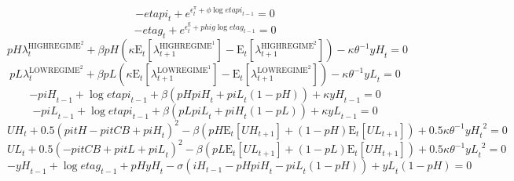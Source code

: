 \begin{equation}
-{e\!t\!a\!p\!i}_{t} + e^{\epsilon^{\pi}_{t} + {\phi} {\log{{e\!t\!a\!p\!i}_{t-1}}}} = 0
\end{equation}
\begin{equation}
-{e\!t\!a\!g}_{t} + e^{\epsilon^{\mathrm{g}}_{t} + {{p\!h\!i\!g}} {\log{{e\!t\!a\!g}_{t-1}}}} = 0
\end{equation}
\begin{equation}
{{p\!H}} {\lambda^{\mathrm{HIGHREGIME}^{\mathrm{2}}}_{t}} + {\beta} {{p\!H}} \left({\kappa} {\mathrm{E}_{t}\left[\lambda^{\mathrm{HIGHREGIME}^{\mathrm{1}}}_{t+1}\right]} - \mathrm{E}_{t}\left[\lambda^{\mathrm{HIGHREGIME}^{\mathrm{2}}}_{t+1}\right]\right) - {\kappa} {\theta}^{-1} {{y\!H}_{t}} = 0
\end{equation}
\begin{equation}
{{p\!L}} {\lambda^{\mathrm{LOWREGIME}^{\mathrm{2}}}_{t}} + {\beta} {{p\!L}} \left({\kappa} {\mathrm{E}_{t}\left[\lambda^{\mathrm{LOWREGIME}^{\mathrm{1}}}_{t+1}\right]} - \mathrm{E}_{t}\left[\lambda^{\mathrm{LOWREGIME}^{\mathrm{2}}}_{t+1}\right]\right) - {\kappa} {\theta}^{-1} {{y\!L}_{t}} = 0
\end{equation}
\begin{equation}
-{p\!i\!H}_{t-1} + \log{{e\!t\!a\!p\!i}_{t-1}} + {\beta} \left({{p\!H}} {{p\!i\!H}_{t}} + {{p\!i\!L}_{t}} \left(1 - {p\!H}\right)\right) + {\kappa} {{y\!H}_{t-1}} = 0
\end{equation}
\begin{equation}
-{p\!i\!L}_{t-1} + \log{{e\!t\!a\!p\!i}_{t-1}} + {\beta} \left({{p\!L}} {{p\!i\!L}_{t}} + {{p\!i\!H}_{t}} \left(1 - {p\!L}\right)\right) + {\kappa} {{y\!L}_{t-1}} = 0
\end{equation}
\begin{equation}
{U\!H}_{t} + 0.5\left({p\!i\!t\!H} - {p\!i\!t\!C\!B} + {p\!i\!H}_{t}\right)^{2} - {\beta} \left({{p\!H}} {\mathrm{E}_{t}\left[{U\!H}_{t+1}\right]} + \left(1 - {p\!H}\right) {\mathrm{E}_{t}\left[{U\!L}_{t+1}\right]}\right) + 0.5{\kappa} {\theta}^{-1} {{y\!H}_{t}}^{2} = 0
\end{equation}
\begin{equation}
{U\!L}_{t} + 0.5\left(-{p\!i\!t\!C\!B} + {p\!i\!t\!L} + {p\!i\!L}_{t}\right)^{2} - {\beta} \left({{p\!L}} {\mathrm{E}_{t}\left[{U\!L}_{t+1}\right]} + \left(1 - {p\!L}\right) {\mathrm{E}_{t}\left[{U\!H}_{t+1}\right]}\right) + 0.5{\kappa} {\theta}^{-1} {{y\!L}_{t}}^{2} = 0
\end{equation}
\begin{equation}
-{y\!H}_{t-1} + \log{{e\!t\!a\!g}_{t-1}} + {{p\!H}} {{y\!H}_{t}} - {\sigma} \left({i\!H}_{t-1} - {{p\!H}} {{p\!i\!H}_{t}} - {{p\!i\!L}_{t}} \left(1 - {p\!H}\right)\right) + {{y\!L}_{t}} \left(1 - {p\!H}\right) = 0
\end{equation}
